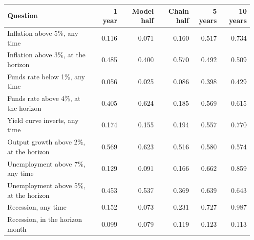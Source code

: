 \begin{tabular}{lrrrrr}
\toprule
Question & 1 year & Model half & Chain half & 5 years & 10 years \\
\midrule
Inflation above 5\%, any time & 0.116 & 0.071 & 0.160 & 0.517 & 0.734 \\
Inflation above 3\%, at the horizon & 0.485 & 0.400 & 0.570 & 0.492 & 0.509 \\
Funds rate below 1\%, any time & 0.056 & 0.025 & 0.086 & 0.398 & 0.429 \\
Funds rate above 4\%, at the horizon & 0.405 & 0.624 & 0.185 & 0.569 & 0.615 \\
Yield curve inverts, any time & 0.174 & 0.155 & 0.194 & 0.557 & 0.770 \\
Output growth above 2\%, at the horizon & 0.569 & 0.623 & 0.516 & 0.580 & 0.574 \\
Unemployment above 7\%, any time & 0.129 & 0.091 & 0.166 & 0.662 & 0.859 \\
Unemployment above 5\%, at the horizon & 0.453 & 0.537 & 0.369 & 0.639 & 0.643 \\
Recession, any time & 0.152 & 0.073 & 0.231 & 0.727 & 0.987 \\
Recession, in the horizon month & 0.099 & 0.079 & 0.119 & 0.123 & 0.113 \\
\bottomrule
\end{tabular}
